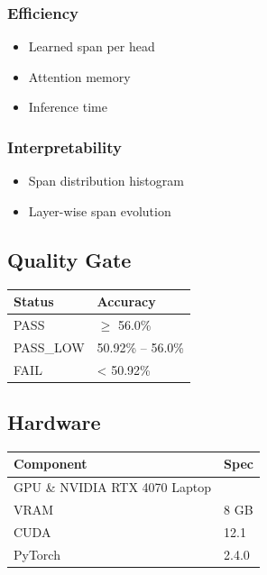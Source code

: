 \subsubsection{Efficiency}
\begin{itemize}
\item Learned span per head
\item Attention memory
\item Inference time

\end{itemize}
\subsubsection{Interpretability}
\begin{itemize}
\item Span distribution histogram
\item Layer-wise span evolution

\end{itemize}
\subsection{Quality Gate}

\begin{table}[H]
\centering
\small
\begin{tabular}{ll}
\toprule
\textbf{Status} & \textbf{Accuracy} \\
\midrule
PASS & $\ge$ 56.0\% \\
PASS\_LOW & 50.92\% -- 56.0\% \\
FAIL & < 50.92\% \\
\bottomrule
\end{tabular}
\end{table}

\subsection{Hardware}

\begin{table}[H]
\centering
\small
\begin{tabular}{ll}
\toprule
\textbf{Component} & \textbf{Spec} \\
\midrule
GPU \& NVIDIA RTX 4070 Laptop \\
VRAM & 8 GB \\
CUDA & 12.1 \\
PyTorch & 2.4.0 \\
\bottomrule
\end{tabular}
\end{table}

